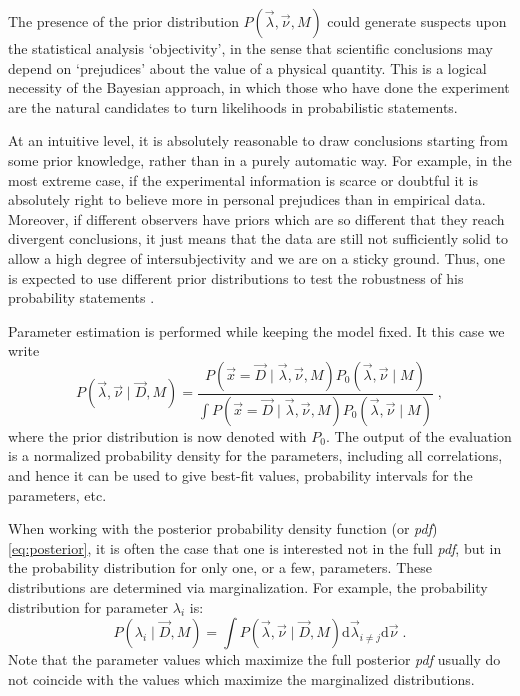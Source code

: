  The presence of the prior distribution $P(\vec{\lambda},\vec{\nu},M)$ could generate suspects upon the statistical analysis `objectivity', in the sense that scientific conclusions may depend on `prejudices' about the value of a physical quantity. This is a logical necessity of the Bayesian approach, in which those who have done the experiment are the natural candidates to turn likelihoods in probabilistic statements.

At an intuitive level, it is absolutely reasonable to draw conclusions starting from some prior knowledge, rather than in a purely automatic way. For example, in the most extreme case, if the experimental information is scarce or doubtful it is absolutely right to believe more in personal prejudices than in empirical data. Moreover, if different observers have priors which are so different that they reach divergent conclusions, it just means that the data are still not sufficiently solid to allow a high degree of intersubjectivity and we are on a sticky ground. Thus, one is expected to use different prior distributions to test the robustness of his probability statements \cite{bayesbook}.

 Parameter estimation is performed while keeping the model fixed. It this case we write
\begin{equation}P(\vec{\lambda},\vec{\nu}\mid\vec{D},M)=\frac{P(\vec{x}=\vec{D}\mid\vec{\lambda},\vec{\nu},M)P_0(\vec{\lambda},\vec{\nu}\mid M)}{\int P(\vec{x}=\vec{D}\mid\vec{\lambda},\vec{\nu},M)P_0(\vec{\lambda},\vec{\nu}\mid M)}\;,\label{eq:posterior}\end{equation}
where the prior distribution is now denoted with $P_0$. The output of the evaluation is a normalized probability density for the parameters, including all correlations, and hence it can be used to give best-fit values, probability intervals for the parameters, etc.

When working with the posterior probability density function (or \emph{pdf}) \ref{eq:posterior}, it is often the case that one is interested not in the full \emph{pdf}, but in the probability distribution for only one, or a few, parameters. These distributions are determined via marginalization. For example, the probability distribution for parameter $\lambda_i$ is:
\begin{equation}P(\lambda_i\mid\vec{D},M)=\int P(\vec{\lambda},\vec{\nu}\mid\vec{D},M)\text{d}\vec{\lambda}_{i\neq j}\text{d}\vec{\nu}\;.\end{equation}
Note that the parameter values which maximize the full posterior \emph{pdf} usually do not coincide with the values which maximize the marginalized distributions.

